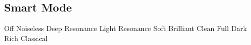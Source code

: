 \subsection{Smart Mode}









































Off
Noiseless
Deep Resonance
Light Resonance
Soft
Brilliant
Clean
Full
Dark
Rich
Classical
